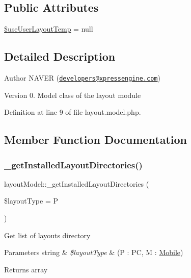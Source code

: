 \subsection*{Public Attributes}
\begin{DoxyCompactItemize}
\item 
\hyperlink{classlayoutModel_a51f307edec8ca62a4cbaffb4833b2d20}{\$use\+User\+Layout\+Temp} = null
\end{DoxyCompactItemize}


\subsection{Detailed Description}
\begin{DoxyAuthor}{Author}
N\+A\+V\+ER (\href{mailto:developers@xpressengine.com}{\tt developers@xpressengine.\+com}) 
\end{DoxyAuthor}
\begin{DoxyVersion}{Version}
0. Model class of the layout module 
\end{DoxyVersion}


Definition at line 9 of file layout.\+model.\+php.



\subsection{Member Function Documentation}
\hypertarget{classlayoutModel_a326452abcba753f4bc8eb689909dc182}{}\label{classlayoutModel_a326452abcba753f4bc8eb689909dc182} 
\subsubsection{\texorpdfstring{\+\_\+get\+Installed\+Layout\+Directories()}{\_getInstalledLayoutDirectories()}}
{\footnotesize\ttfamily layout\+Model\+::\+\_\+get\+Installed\+Layout\+Directories (\begin{DoxyParamCaption}\item[{}]{\$layout\+Type = {\ttfamily \textquotesingle{}P\textquotesingle{}} }\end{DoxyParamCaption})}

Get list of layouts directory 
\begin{DoxyParams}[1]{Parameters}
string & {\em \$layout\+Type} & (P \+: PC, M \+: \hyperlink{classMobile}{Mobile}) \\
\hline
\end{DoxyParams}
\begin{DoxyReturn}{Returns}
array 
\end{DoxyReturn}


